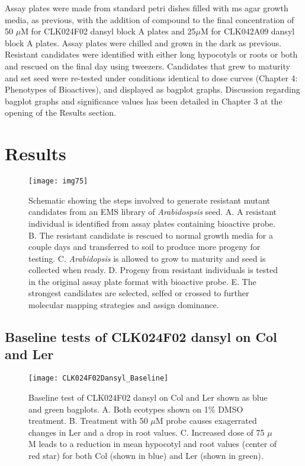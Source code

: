 Assay plates were made from standard petri dishes filled with ms agar growth media, as previous, with the addition of compound to the final concentration of 50 $\mu$M for CLK024F02 dansyl block A plates and 25$\mu$M for CLK042A09 dansyl block A plates. Assay plates were chilled and grown in the dark as previous. Resistant candidates were identified with either long hypocotyls or roots or both and rescued on the final day using tweezers. Candidates that grew to maturity and set seed were re-tested under conditions identical to dose curves (Chapter 4: Phenotypes of Bioactives), and displayed as bagplot graphs. Discussion regarding bagplot graphs and significance values has been detailed in Chapter 3 at the opening of the Results section.

\section{Results}


\begin{figure}
\texttt{[image: img75]}
\caption{Schematic showing the steps involved to generate resistant mutant candidates from an EMS library of {\it Arabidospsis} seed. A. A resistant individual is identified from assay plates containing bioactive probe. B. The resistant candidate is rescued to normal growth media for a couple days and transferred to soil to produce more progeny for testing. C. {\it Arabidopsis} is allowed to grow to maturity and seed is collected when ready. D. Progeny from resistant individuals is tested in the original assay plate format with bioactive probe. E. The strongest candidates are selected, selfed or crossed to further molecular mapping strategies and assign dominance.}
\label{fig:EMS_MutantHowTo}
\end{figure}

\clearpage


\subsection{Baseline tests of CLK024F02 dansyl on Col and Ler}

\begin{figure}
\centering
\texttt{[image: CLK024F02Dansyl\_Baseline]}
\caption{Baseline test of CLK024F02 dansyl on Col and Ler shown as blue and green bagplots. A. Both ecotypes shown on 1{\%} DMSO treatment. B. Treatment with 50 $\mu$M probe causes exagerrated changes in Ler and a drop in root values. C. Increased dose of 75 $\mu$M leads to a reduction in mean hypocotyl and root values (center of red star) for both Col (shown in blue) and Ler (shown in green).} 
\label{fig:CLK024F02Dansyl_Baseline}
\end{figure}

